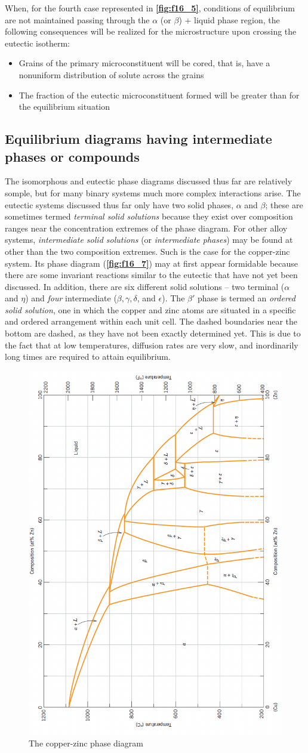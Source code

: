 When, for the fourth case represented in \textbf{\autoref{fig:f16_5}}, conditions of equilibrium are not maintained passing through the $\alpha$ (or $\beta$) + liquid phase region, the following consequences will be realized for the microstructure upon crossing the eutectic isotherm:
\begin{itemize}
  \item Grains of the primary microconstituent will be cored, that is, have a nonuniform distribution of solute across the grains
  \item The fraction of the eutectic microconstituent formed will be greater than for the equilibrium situation
\end{itemize}


\subsection{Equilibrium diagrams having intermediate phases or compounds}
The isomorphous and eutectic phase diagrams discussed thus far are relatively somple, but for many binary systems much more complex interactions arise. The eutectic systems discussed thus far only have two solid phases, $\alpha$ and $\beta$; these are sometimes termed \textit{terminal solid solutions} because they exist over composition ranges near the concentration extremes of the phase diagram. For other alloy systems, \textit{intermediate solid solutions} (or \textit{intermediate phases}) may be found at other than the two composition extremes. Such is the case for the copper-zinc system. Its phase diagram (\textbf{\autoref{fig:f16_7}}) may at first appear formidable because there are some invariant reactions similar to the eutectic that have not yet been discussed. In addition, there are six different solid solutions -- two terminal ($\alpha$ and $\eta$) and \textit{four} intermediate ($\beta, \gamma, \delta$, and $\epsilon$). The $\beta'$ phase is termed an \textit{ordered solid solution}, one in which the copper and zinc atoms are situated in a specific and ordered arrangement within each unit cell. The dashed boundaries near the bottom are dashed, as they have not been exactly determined yet. This is due to the fact that at low temperatures, diffusion rates are very slow, and inordinarily long times are required to attain equilibrium.

\begin{figure} [ht]
  \centering
  \includegraphics[width=0.35\linewidth]{./figures/f16_7.png}
  \caption{The copper-zinc phase diagram}
  \label{fig:f16_7}
\end{figure}

